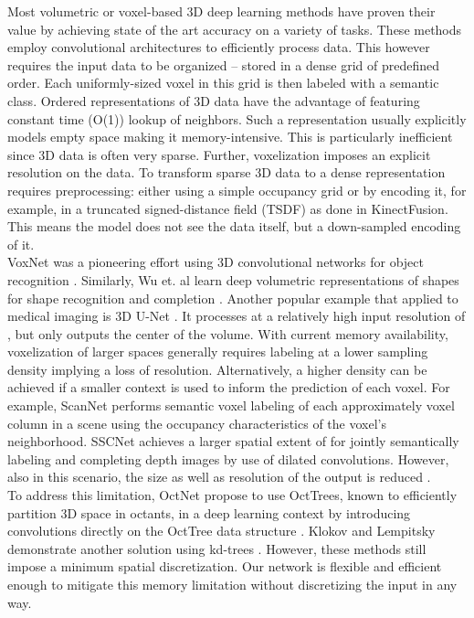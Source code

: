 \documentclass[runningheads]{llncs}
\begin{document}
Most volumetric or voxel-based 3D deep learning methods have proven their value by achieving state of the art accuracy \cite{Dai2017,Maturana2015,Cicek2016,Milletari2016,Song2016} on a variety of tasks. These methods employ convolutional architectures to efficiently process data. This however requires the input data to be organized -- stored in a dense grid of predefined order. Each uniformly-sized voxel in this grid is then labeled with a semantic class. Ordered representations of 3D data have the advantage of featuring constant time (O(1)) lookup of neighbors. Such a representation usually explicitly models empty space making it memory-intensive. This is particularly inefficient since 3D data is often very sparse. Further, voxelization imposes an explicit resolution on the data. To transform sparse 3D data to a dense representation requires preprocessing: either using a simple occupancy grid or by encoding it, for example, in a truncated signed-distance field (TSDF) as done in KinectFusion\cite{Izadi2011,Song2016}. This means the model does not see the data itself, but a down-sampled encoding of it.\\

VoxNet was a pioneering effort using 3D convolutional networks for object recognition \cite{Maturana2015}.
Similarly, Wu et. al learn deep volumetric representations of shapes for shape recognition and completion \cite{Wu2015}. Another popular example that applied to medical imaging is 3D U-Net \cite{Cicek2016}. It processes at a relatively high input resolution of , but only outputs the center of the volume. With current memory availability, voxelization of larger spaces generally requires labeling at a lower sampling density implying a loss of resolution. Alternatively, a higher density can be achieved if a smaller context is used to inform the prediction of each voxel. For example, ScanNet \cite{Dai2017} performs semantic voxel labeling of each approximately  voxel column in a scene using the occupancy characteristics of the voxel's neighborhood.
SSCNet achieves a larger spatial extent of  for jointly semantically labeling and completing depth images by use of dilated convolutions. However, also in this scenario, the size as well as resolution of the output is reduced \cite{Song2016}.
\\

To address this limitation, OctNet propose to use OctTrees, known to efficiently partition 3D space in octants, in a deep learning context by introducing convolutions directly on the OctTree data structure \cite{Riegler2017}. Klokov and Lempitsky demonstrate another solution using kd-trees \cite{Klokov2017}. However, these methods still impose a minimum spatial discretization. Our network is flexible and efficient enough to mitigate this memory limitation without discretizing the input in any way.
\end{document}

